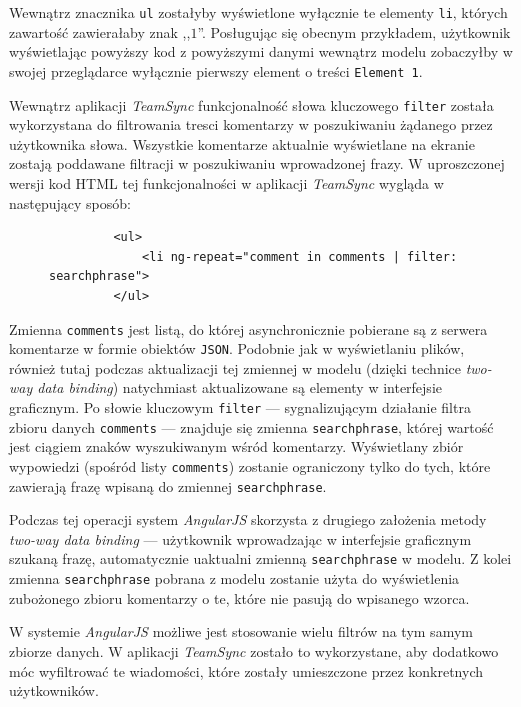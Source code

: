 Wewnątrz znacznika \texttt{ul} zostałyby wyświetlone wyłącznie te elementy \texttt{li}, których zawartość zawierałaby znak ,,$1$''. Posługując się obecnym przykładem, użytkownik wyświetlając powyższy kod z powyższymi danymi wewnątrz modelu zobaczyłby w swojej przeglądarce wyłącznie pierwszy element o treści \texttt{Element 1}.

Wewnątrz aplikacji \emph{TeamSync} funkcjonalność słowa kluczowego \texttt{filter} została wykorzystana do filtrowania tresci komentarzy w poszukiwaniu żądanego przez użytkownika słowa. Wszystkie komentarze aktualnie wyświetlane na ekranie zostają poddawane filtracji w poszukiwaniu wprowadzonej frazy. W uproszczonej wersji kod HTML tej funkcjonalności w aplikacji \emph{TeamSync} wygląda w następujący sposób:

\begin{figure}[htb]
\begin{verbatim}
         <ul>
             <li ng-repeat="comment in comments | filter: searchphrase">
         </ul>
\end{verbatim}
\end{figure}

Zmienna \texttt{comments} jest listą, do której asynchronicznie pobierane są z serwera komentarze w formie obiektów \texttt{JSON}. Podobnie jak w wyświetlaniu plików, również tutaj podczas aktualizacji tej zmiennej w modelu (dzięki technice \emph{two-way data binding}) natychmiast aktualizowane są elementy w interfejsie graficznym. Po słowie kluczowym \texttt{filter} --- sygnalizującym działanie filtra zbioru danych \texttt{comments} --- znajduje się zmienna \texttt{searchphrase}, której wartość jest ciągiem znaków wyszukiwanym wśród komentarzy. Wyświetlany zbiór wypowiedzi (spośród listy \texttt{comments}) zostanie ograniczony tylko do tych, które zawierają frazę wpisaną do zmiennej \texttt{searchphrase}.

Podczas tej operacji system \emph{AngularJS} skorzysta z drugiego założenia metody \emph{two-way data binding} --- użytkownik wprowadzając w interfejsie graficznym szukaną frazę, automatycznie uaktualni zmienną \texttt{searchphrase} w modelu. Z kolei zmienna \texttt{searchphrase} pobrana z modelu zostanie użyta do wyświetlenia zubożonego zbioru komentarzy o te, które nie pasują do wpisanego wzorca.

W systemie \emph{AngularJS} możliwe jest stosowanie wielu filtrów na tym samym zbiorze danych. W aplikacji \emph{TeamSync} zostało to wykorzystane, aby dodatkowo móc wyfiltrować te wiadomości, które zostały umieszczone przez konkretnych użytkowników.